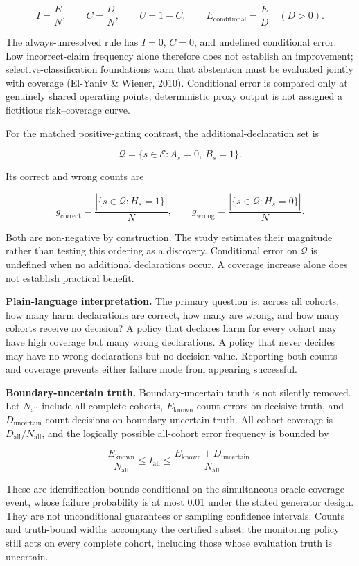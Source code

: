 \documentclass[
]{article}
\begin{document}
\[
I=\frac{E}{N},
\qquad
C=\frac{D}{N},
\qquad
U=1-C,
\qquad
E_{\mathrm{conditional}}=\frac{E}{D}\quad(D>0).
\]

The always-unresolved rule has \(I=0\), \(C=0\), and undefined
conditional error. Low incorrect-claim frequency alone therefore does
not establish an improvement; selective-classification foundations warn
that abstention must be evaluated jointly with coverage (El-Yaniv \&
Wiener, 2010). Conditional error is compared only at genuinely shared
operating points; deterministic proxy output is not assigned a
fictitious risk--coverage curve.

For the matched positive-gating contrast, the additional-declaration set
is

\[
\mathcal{Q}=\{s\in\mathcal{E}:A_s=0,\ B_s=1\}.
\]

Its correct and wrong counts are

\[
g_{\mathrm{correct}}=\frac{|\{s\in\mathcal{Q}:\widetilde H_s=1\}|}{N},
\qquad
g_{\mathrm{wrong}}=\frac{|\{s\in\mathcal{Q}:\widetilde H_s=0\}|}{N}.
\]

Both are non-negative by construction. The study estimates their
magnitude rather than testing this ordering as a discovery. Conditional
error on \(\mathcal{Q}\) is undefined when no additional declarations
occur. A coverage increase alone does not establish practical benefit.

\textbf{Plain-language interpretation.} The primary question is: across
all cohorts, how many harm declarations are correct, how many are wrong,
and how many cohorts receive no decision? A policy that declares harm
for every cohort may have high coverage but many wrong declarations. A
policy that never decides may have no wrong declarations but no decision
value. Reporting both counts and coverage prevents either failure mode
from appearing successful.

\textbf{Boundary-uncertain truth.} Boundary-uncertain truth is not
silently removed. Let \(N_{\mathrm{all}}\) include all complete cohorts,
\(E_{\mathrm{known}}\) count errors on decisive truth, and
\(D_{\mathrm{uncertain}}\) count decisions on boundary-uncertain truth.
All-cohort coverage is \(D_{\mathrm{all}}/N_{\mathrm{all}}\), and the
logically possible all-cohort error frequency is bounded by

\[
\frac{E_{\mathrm{known}}}{N_{\mathrm{all}}}
\le I_{\mathrm{all}}\le
\frac{E_{\mathrm{known}}+D_{\mathrm{uncertain}}}{N_{\mathrm{all}}}.
\]

These are identification bounds conditional on the simultaneous
oracle-coverage event, whose failure probability is at most 0.01 under
the stated generator design. They are not unconditional guarantees or
sampling confidence intervals. Counts and truth-bound widths accompany
the certified subset; the monitoring policy still acts on every complete
cohort, including those whose evaluation truth is uncertain.
\end{document}
